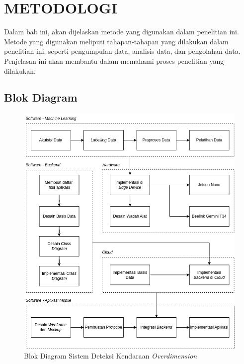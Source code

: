 \chapter{METODOLOGI}
\label{chap:metodologi}


Dalam bab ini, akan dijelaskan metode yang digunakan dalam penelitian ini. Metode yang digunakan meliputi tahapan-tahapan yang dilakukan dalam penelitian ini, seperti pengumpulan data, analisis data, dan pengolahan data. Penjelasan ini akan membantu dalam memahami proses penelitian yang dilakukan.

\section{Blok Diagram}

\begin{figure}[htbp]
  \centering

  \includegraphics[scale=0.55]{gambar/bab3-block-diagram.png}

  \caption{Blok Diagram Sistem Deteksi Kendaraan \emph{Overdimension}}
  \label{fig:blockdiagrammethod}
\end{figure}


